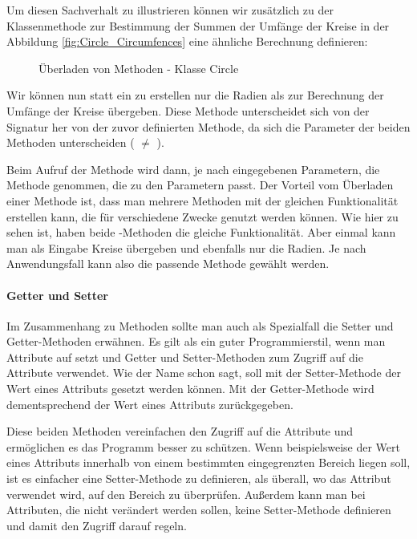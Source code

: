 \documentclass{tuda-pub}
\begin{document}
  \br

  Um diesen Sachverhalt zu illustrieren können wir zusätzlich zu der Klassenmethode zur
  Bestimmung der Summen der Umfänge der Kreise in der Abbildung \ref{fig:Circle_Circumfences}
  eine ähnliche Berechnung definieren:

  \begin{figure}[h]
    \centering
    
    \caption{Überladen von Methoden - Klasse Circle}
  \end{figure}

  Wir können nun statt ein  zu erstellen nur die Radien als
   zur Berechnung der Umfänge der Kreise übergeben. Diese Methode
  unterscheidet sich von der Signatur her von der zuvor definierten Methode, da sich die
  Parameter der beiden Methoden unterscheiden ( \(\neq\) ).

  \br

  Beim Aufruf der Methode wird dann, je nach eingegebenen Parametern, die Methode genommen, die
  zu den Parametern passt. Der Vorteil vom Überladen einer Methode ist, dass man mehrere Methoden
  mit der gleichen Funktionalität erstellen kann, die für verschiedene Zwecke genutzt werden
  können. Wie hier zu sehen ist, haben beide -Methoden die gleiche
  Funktionalität. Aber einmal kann man als Eingabe Kreise übergeben und ebenfalls nur die Radien.
  Je nach Anwendungsfall kann also die passende Methode gewählt werden.

  \paragraph{Getter und Setter}

  Im Zusammenhang zu Methoden sollte man auch als Spezialfall die Setter und Getter-Methoden
  erwähnen. Es gilt als ein guter Programmierstil, wenn man Attribute auf 
  setzt und Getter und Setter-Methoden zum Zugriff auf die Attribute verwendet. Wie der Name
  schon sagt, soll mit der Setter-Methode der Wert eines Attributs gesetzt werden können. Mit der
  Getter-Methode wird dementsprechend der Wert eines Attributs zurückgegeben.

  \br

  Diese beiden Methoden vereinfachen den Zugriff auf die Attribute und ermöglichen es das
  Programm besser zu schützen. Wenn beispielsweise der Wert eines Attributs innerhalb von einem
  bestimmten eingegrenzten Bereich liegen soll, ist es einfacher eine Setter-Methode zu
  definieren, als überall, wo das Attribut verwendet wird, auf den Bereich zu überprüfen.
  Außerdem kann man bei Attributen, die nicht verändert werden sollen, keine Setter-Methode
  definieren und damit den Zugriff darauf regeln.
\end{document}
